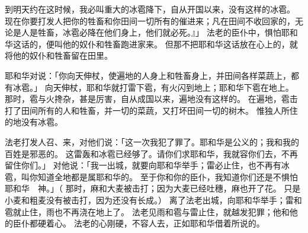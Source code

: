 {到明天约在这时候，我必叫重大的冰雹降下，自从{}开国以来，没有这样的冰雹。
现在你要打发人把你的牲畜和你田间一切所有的催进来；凡在田间不收回家的，无论是人是牲畜，冰雹必降在他们身上，他们就必死。』」
法老的臣仆中，惧怕耶和华这话的，便叫他的奴仆和牲畜跑进家来。
但那不把耶和华这话放在心上的，就将他的奴仆和牲畜留在田里。
\par }{\PP {}耶和华对{}说：「你向天伸杖，使{}遍地的人身上和牲畜身上，并田间各样菜蔬上，都有冰雹。」
向天伸杖，耶和华就打雷下雹，有火闪到地上；耶和华下雹在{}地上。
那时，雹与火搀杂，甚是厉害，自从{}成国以来，遍地没有这样的。
在{}遍地，雹击打了田间所有的人和牲畜，并一切的菜蔬，又打坏田间一切的树木。
惟独{}人所住的{}地没有冰雹。
\par }{\PP {}法老打发人召{}、{}来，对他们说：「这一次我犯了罪了。耶和华是公义的；我和我的百姓是邪恶的。
这雷轰和冰雹已经够了。请你们求耶和华，我就容你们去，不再留住你们。」
对他说：「我一出城，就要向耶和华举手{}；雷必止住，也不再有冰雹，叫你知道全地都是属耶和华的。
至于你和你的臣仆，我知道你们还是不惧怕耶和华　神。」（
那时，麻和大麦被{}击打；因为大麦已经吐穗，麻也开了花。
只是小麦和粗麦没有被击打，因为还没有长成。）
离了法老出城，向耶和华举手{}；雷和雹就止住，雨也不再浇在地上了。
法老见雨和雹与雷止住，就越发犯罪；他和他的臣仆都硬着心。
法老的心刚硬，不容{}人去，正如耶和华借着{}所说的。

}
